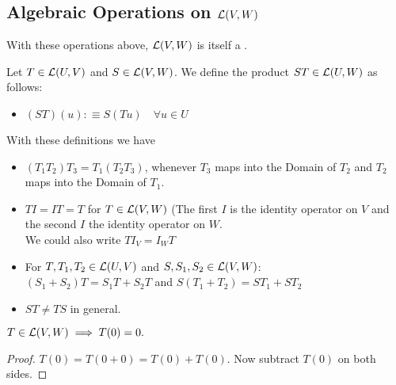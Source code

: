 \subsection{Algebraic Operations on $\mathcal{L}(V,W)$}

\setcounter{thm}{5}
\begin{thm}
  With these operations above, ${\mathcal{L}(V,W)}$ is itself a \vs.
\end{thm}

\setcounter{thm}{6}
\begin{mydef}
  Let $T \in {\mathcal{L}(U, V)}$ and $S \in {\mathcal{L}(V, W)}$. We define the product $ST \in {\mathcal{L}(U, W)}$ as follows:
  \begin{itemize}
    \item[] $(ST)(u) :\equiv S(Tu) \quad \forall u \in U$
  \end{itemize}
\end{mydef}

\begin{thm}
  With these definitions we have
  \begin{itemize}
    \item {} $(T_1 T_2) T_3 = T_1 (T_2 T_3)$, whenever $T_3$ maps into the Domain of $T_2$ and $T_2$ maps into the Domain of $T_1$.
    \item {} $T I = I T = T$ for $T \in {\mathcal{L}(V,W)}$ (The first $I$ is the identity operator on $V$ and the second $I$ the identity operator on $W$. \\
    We could also write $T I_V = I_W T$
    \item {} For $T, T_1, T_2 \in {\mathcal{L}(U, V)}$ and $S, S_1, S_2 \in {\mathcal{L}(V, W)}$: \\ $(S_1 + S_2)T=S_1 T + S_2 T$ and $S(T_1 + T_2)=S T_1 + S T_2$
    \item {} $ST \neq TS$ in general.
  \end{itemize}
\end{thm}

\setcounter{thm}{9}
\begin{thm}
  $T\in {\mathcal{L}(V,W)} \implies T(0)=0.$
\end{thm}
\begin{proof}
  $T(0) = T(0+0) = T(0) + T(0)$. Now subtract $T(0)$ on both sides.
\end{proof}